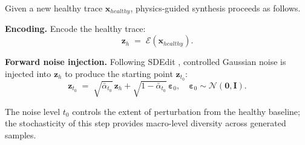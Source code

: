 \documentclass[conference]{IEEEtran}
\newcommand{\Enc}{\mathcal{E}}
\newcommand{\z}{\mathbf{z}}
\newcommand{\x}{\mathbf{x}}
\begin{document}
Given a new healthy trace $\x_{healthy}$, physics-guided synthesis proceeds as follows.

\textbf{Encoding.} Encode the healthy trace:
\begin{equation}
  \z_h \;=\; \Enc(\x_{healthy}).
  \label{eq:encode_healthy}
\end{equation}

\textbf{Forward noise injection.} Following SDEdit \cite{sdedit2021}, controlled Gaussian noise is injected into $\z_h$ to produce the starting point $\z_{t_0}$:
\begin{equation}
  \z_{t_0} \;=\;
    \sqrt{\bar{\alpha}_{t_0}}\,\z_h
    + \sqrt{1-\bar{\alpha}_{t_0}}\,\boldsymbol{\varepsilon}_0,
    \quad \boldsymbol{\varepsilon}_0\sim\mathcal{N}(\mathbf{0},\mathbf{I}).
  \label{eq:forward_noise}
\end{equation}


The noise level $t_0$ controls the extent of perturbation from the healthy baseline; the stochasticity of this step provides macro-level diversity across generated samples.
\end{document}
